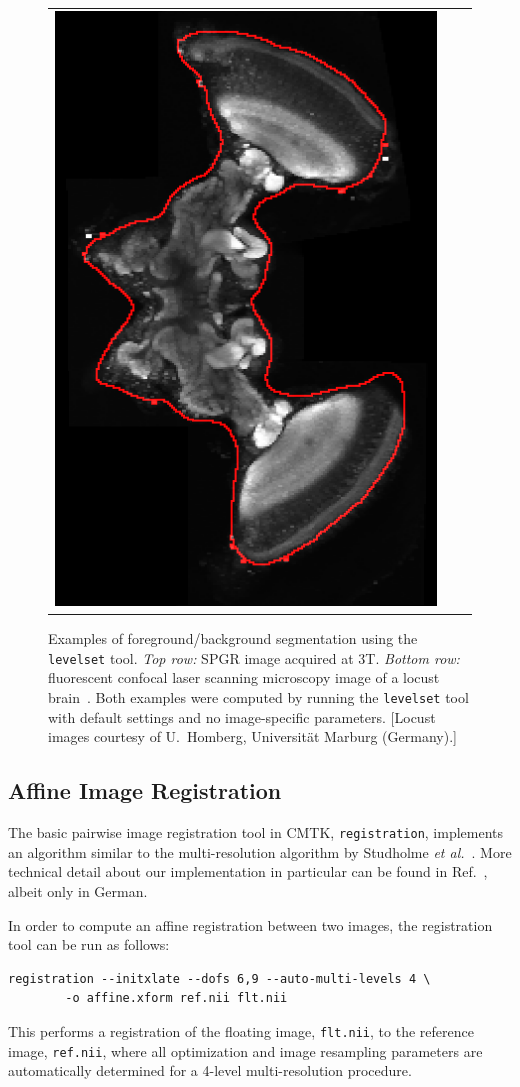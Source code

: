 \documentclass{InsightArticle}
\begin{document}
\begin{figure}[tb]
\begin{center}
\begin{tabular}{ccc}
\includegraphics[width=.3\linewidth]{img/levelset_locust_ovl}
\end{tabular}
\end{center}
\caption{Examples of foreground/background segmentation using the {\tt
levelset} tool. {\em Top row:\/} SPGR image acquired at 3T. {\em Bottom
row:\/} fluorescent confocal laser scanning microscopy image of a locust
brain~\cite{KuryRohlKrof:2008}. Both examples were computed by running the
{\tt levelset} tool with default settings and no image-specific
parameters. [Locust images courtesy of U.~Homberg, Universit\"at Marburg
(Germany).]  }
\label{fig:Levelset}
\end{figure}

\subsection{Affine Image Registration}

The basic pairwise image registration 
tool in CMTK, \verb|registration|,  implements an algorithm similar to the multi-resolution
algorithm by Studholme {\em et al.\/}~\cite{StudHillHawk:1997}. More technical
detail about our implementation in particular can be found in
Ref.~\cite{Rohlfing:2000}, albeit only in German.

In order to compute an affine registration  between
two images, the registration tool can be run as follows:
\begin{verbatim}
registration --initxlate --dofs 6,9 --auto-multi-levels 4 \
        -o affine.xform ref.nii flt.nii
\end{verbatim}
This performs a registration of the floating image, \verb|flt.nii|, to the
reference image, \verb|ref.nii|, where all optimization and image resampling
parameters are automatically determined for a 4-level multi-resolution
procedure. 
\end{document}
